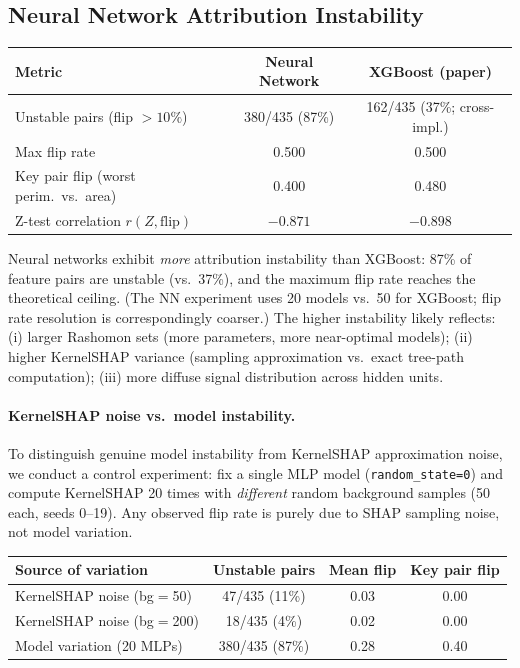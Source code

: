 \documentclass{article}
\begin{document}
\subsection{Neural Network Attribution Instability}

\begin{center}
\small
\begin{tabular}{@{}lcc@{}}
\toprule
Metric & Neural Network & XGBoost (paper) \\
\midrule
Unstable pairs (flip $> 10\%$) & 380/435 (87\%) & 162/435 (37\%; cross-impl.) \\
Max flip rate & 0.500 & 0.500 \\
Key pair flip (worst perim.\ vs.\ area) & 0.400 & 0.480 \\
Z-test correlation $r(Z, \text{flip})$ & $-0.871$ & $-0.898$ \\
\bottomrule
\end{tabular}
\end{center}

Neural networks exhibit \emph{more} attribution instability than XGBoost: 87\% of feature pairs are unstable (vs.\ 37\%), and the maximum flip rate reaches the theoretical ceiling. (The NN experiment uses 20 models vs.\ 50 for XGBoost; flip rate resolution is correspondingly coarser.) The higher instability likely reflects: (i) larger Rashomon sets (more parameters, more near-optimal models); (ii) higher KernelSHAP variance (sampling approximation vs.\ exact tree-path computation); (iii) more diffuse signal distribution across hidden units.

\paragraph{KernelSHAP noise vs.\ model instability.}
To distinguish genuine model instability from KernelSHAP approximation
noise, we conduct a control experiment: fix a single MLP model
(\texttt{random\_state=0}) and compute KernelSHAP 20 times with
\emph{different} random background samples (50 each, seeds 0--19).
Any observed flip rate is purely due to SHAP sampling noise, not
model variation.

\begin{center}
\small
\begin{tabular}{@{}lccc@{}}
\toprule
Source of variation & Unstable pairs & Mean flip & Key pair flip \\
\midrule
KernelSHAP noise (bg$=$50) & 47/435 (11\%) & 0.03 & 0.00 \\
KernelSHAP noise (bg$=$200) & 18/435 (4\%) & 0.02 & 0.00 \\
Model variation (20 MLPs) & 380/435 (87\%) & 0.28 & 0.40 \\
\bottomrule
\end{tabular}
\end{center}
\end{document}

